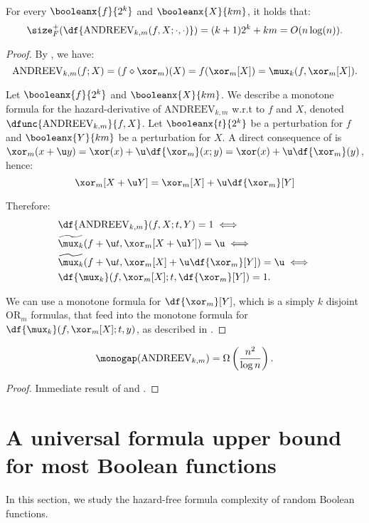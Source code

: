\documentclass[acmsmall, nonacm, authorversion]{acmart}
\begin{document}
\begin{claim}\label{claim:andreev-der}
For every $\booleanx{f}{2^k}$ and $\booleanx{X}{km}$, it holds that:
\[
\size_F^+(\df{\text{ANDREEV}_{k,m}(f,X;\cdot,\cdot)})=(k+1)2^k+km=O(n\log(n)).
\]
\end{claim}
\begin{proof}
By , we have:
\[
\text{ANDREEV}_{k,m}(f;X)=(f\diamond \xor_m)(X)=f(\xor_m[X])=\mux_k(f,\xor_m[X]).
\]

Let $\booleanx{f}{2^k}$ and $\booleanx{X}{km}$. We describe a monotone formula for the hazard-derivative of $\text{ANDREEV}_{k,m}$ w.r.t to $f$ and $X$, denoted $\dfunc{\text{ANDREEV}_{k,m}}{f,X}$. Let $\booleanx{t}{2^k}$ be a perturbation for $f$ and $\booleanx{Y}{km}$ be a perturbation for $X$. A direct consequence of  is $\xor_m(x+\u y)=\xor(x)+\u\df{\xor_m}(x;y)=\xor(x)+\u\df{\xor_m}(y)$, hence:
\[
\xor_m[X+\u Y]=\xor_m[X]+\u \df{\xor_m}[Y]\]

Therefore:
\begin{align*}
&\df{\text{ANDREEV}_{k,m}}(f,X;t,Y)=1 \iff \\
&\widetilde{\mux_k}(f+\u t,\xor_m[X+\u Y])=\u \iff \\
&\widetilde{\mux_k}(f+\u t,\xor_m[X]+\u \df{\xor_m}[Y])=\u \iff \\
&\df{\mux_k}(f,\xor_m[X];t,\df{\xor_m}[Y])=1.
\end{align*}

We can use a monotone formula for $\df{\xor_m}[Y]$, which is a simply $k$ disjoint $\text{OR}_m$ formulas, that feed into the monotone formula for $\df{\mux_k}(f, \xor_m[X];t,y)$, as described in \cite[Proposition 1]{IK23}.
\end{proof}

\begin{corollary}
    \[
    \monogap(\text{ANDREEV}_{k,m})=\Omega\left(\frac{n^2}{\log n}\right).
    \]
\end{corollary}
\begin{proof}
Immediate result of  and .
\end{proof}

\section{A universal formula upper bound for most Boolean functions}\label{sec:universal}
In this section, we study the hazard-free formula complexity of random Boolean functions. 
\end{document}
